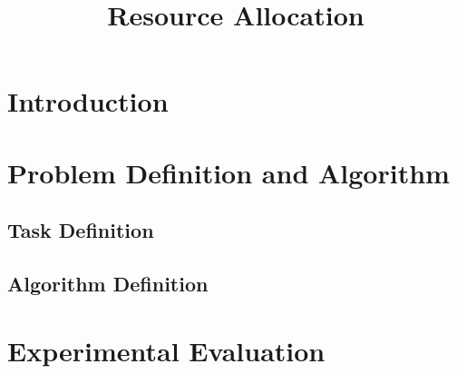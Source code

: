 \documentclass[conference]{IEEEtran}
\begin{document}
\title{Resource Allocation}

\author{
}
\maketitle

\begin{abstract}
\end{abstract}

\section{Introduction}

\section{Problem Definition and Algorithm}
\subsection{Task Definition}
\subsection{Algorithm Definition}

\section{Experimental Evaluation}
\end{document}
